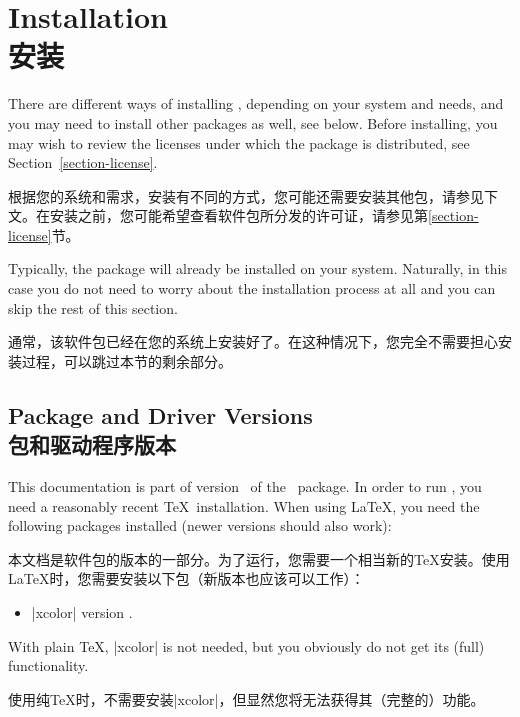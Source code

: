 %
%
%


\section{Installation\\安装}

There are different ways of installing \pgfname, depending on your system and
needs, and you may need to install other packages as well, see below. Before
installing, you may wish to review the licenses under which the package is
distributed, see Section~\ref{section-license}.

根据您的系统和需求，安装\pgfname 有不同的方式，您可能还需要安装其他包，请参见下文。在安装之前，您可能希望查看软件包所分发的许可证，请参见第\ref{section-license}节。

Typically, the package will already be installed on your system. Naturally, in
this case you do not need to worry about the installation process at all and
you can skip the rest of this section.

通常，该软件包已经在您的系统上安装好了。在这种情况下，您完全不需要担心安装过程，可以跳过本节的剩余部分。


\subsection{Package and Driver Versions\\包和驱动程序版本}

This documentation is part of version \pgfversion\ of the \pgfname\ package. In
order to run \pgfname, you need a reasonably recent \TeX\ installation. When
using \LaTeX, you need the following packages installed (newer versions should
also work):

本文档是\pgfname 软件包的\pgfversion 版本的一部分。为了运行\pgfname，您需要一个相当新的\TeX 安装。使用\LaTeX 时，您需要安装以下包（新版本也应该可以工作）：
%
\begin{itemize}
    \item |xcolor| version \xcolorversion.
\end{itemize}
%
With plain \TeX, |xcolor| is not needed, but you obviously do not get its
(full) functionality.

使用纯\TeX 时，不需要安装|xcolor|，但显然您将无法获得其（完整的）功能。

